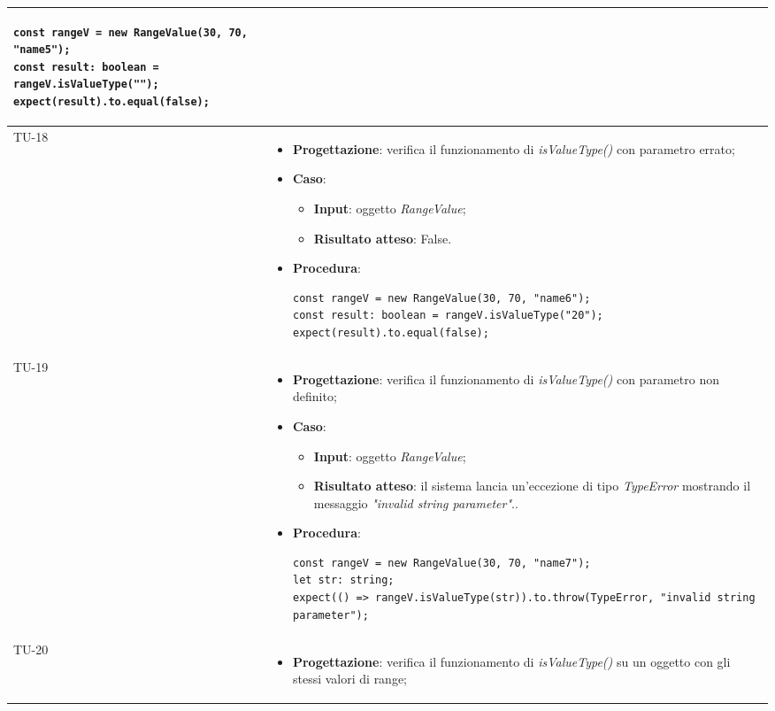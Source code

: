 \begin{longtable}{|C{1.5cm}|C{14.5cm}|}
\begin{itemize}
			\begin{lstlisting}
const rangeV = new RangeValue(30, 70, "name5");
const result: boolean = rangeV.isValueType("");
expect(result).to.equal(false);			
			\end{lstlisting}
		\end{itemize}\\
	\hline
	{TU-18} &  
	\begin{itemize}
		\item \textbf{Progettazione}: verifica il funzionamento di \emph{isValueType()} con parametro errato;
		\item \textbf{Caso}: 
		\begin{itemize}
			\item \textbf{Input}: oggetto \emph{RangeValue};
			\item \textbf{Risultato atteso}: False.
		\end{itemize}
		\item \textbf{Procedura}:
		\begin{lstlisting}
const rangeV = new RangeValue(30, 70, "name6");
const result: boolean = rangeV.isValueType("20");
expect(result).to.equal(false);		
		\end{lstlisting}
	\end{itemize}\\
	\hline
	{TU-19} &  
	\begin{itemize}
			\item \textbf{Progettazione}: verifica il funzionamento di \emph{isValueType()} con parametro non definito;
			\item \textbf{Caso}: 
			\begin{itemize}
				\item \textbf{Input}: oggetto \emph{RangeValue};
				\item \textbf{Risultato atteso}: il sistema lancia un'eccezione di tipo \emph{TypeError} mostrando il messaggio \emph{"invalid string parameter"}..
			\end{itemize}
			\item \textbf{Procedura}:
			\begin{lstlisting}
const rangeV = new RangeValue(30, 70, "name7");
let str: string;
expect(() => rangeV.isValueType(str)).to.throw(TypeError, "invalid string parameter");			
			\end{lstlisting}
	\end{itemize}\\
	\hline
	{TU-20} &  
	\begin{itemize}
		\item \textbf{Progettazione}: verifica il funzionamento di \emph{isValueType()} su un oggetto con gli stessi valori di range;

\end{itemize}
\end{longtable}
